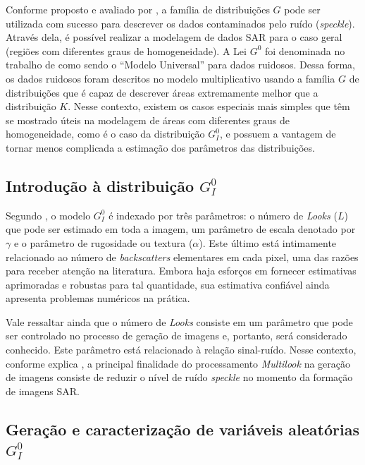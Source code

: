 Conforme proposto e avaliado por \citet{Clutter1997}, a família de distribuições $G$ pode ser utilizada com sucesso para descrever os dados contaminados pelo ruído (\textit{speckle}).
Através dela, é possível realizar a modelagem de dados SAR para o caso geral (regiões com diferentes graus de homogeneidade).
A Lei $G^0$ foi denominada no trabalho de \citet{FreryMinute2004} como sendo o ``Modelo Universal'' para dados ruidosos. 
Dessa forma, os dados ruidosos foram descritos no modelo multiplicativo usando a família $G$ de distribuições que é capaz de descrever áreas extremamente  melhor que a distribuição $K$.
Nesse contexto, existem os casos especiais mais simples que têm se mostrado úteis na modelagem de áreas com diferentes graus de homogeneidade, como é o caso da distribuição $G_I^0$, e possuem a vantagem de tornar menos complicada a estimação dos parâmetros das distribuições. 


\subsection{Introdução à distribuição $G_I^0$}

Segundo \citet{FreryStochasticDistances2015}, o modelo $G_I^0$ é indexado por três parâmetros: o número de \textit{Looks} ($L$) que pode ser estimado em toda a imagem, um parâmetro de escala denotado por $\gamma$ e o parâmetro de rugosidade ou textura ($\alpha$). 
Este último está intimamente relacionado ao número de \textit{backscatters} elementares em cada pixel, uma das razões para receber atenção na literatura. 
Embora haja esforços em fornecer estimativas aprimoradas e robustas para tal quantidade, sua estimativa confiável ainda apresenta problemas numéricos na prática.

Vale ressaltar ainda que o número de \textit{Looks} consiste em um parâmetro que pode ser controlado no processo de geração de imagens e, portanto, será considerado conhecido. 
Este parâmetro está relacionado à relação sinal-ruído. 
Nesse contexto, conforme explica \citet{dissert_torres}, a principal finalidade do processamento \textit{Multilook} na geração de imagens consiste de reduzir o nível de ruído \textit{speckle} no momento da formação de imagens SAR. 

\subsection{Geração e caracterização de variáveis aleatórias $G_I^0$}

